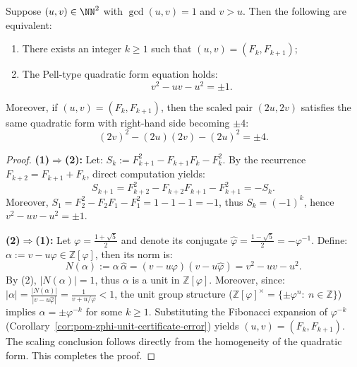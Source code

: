 \begin{proposition}\label{prop:pom-fib-pell-quadratic-characterization}
Suppose $(u,v)\in\NN^2$ with $\gcd(u,v)=1$ and $v>u$.
Then the following are equivalent:
\begin{enumerate}
  \item There exists an integer $k\ge 1$ such that $(u,v)=(F_k,F_{k+1})$;
  \item The Pell-type quadratic form equation holds:
  \[
  \boxed{\;v^2-uv-u^2=\pm 1.\;}
  \]
\end{enumerate}
Moreover, if $(u,v)=(F_k,F_{k+1})$, then the scaled pair $(2u,2v)$ satisfies the same quadratic form with right-hand side becoming $\pm 4$:
\[
(2v)^2-(2u)(2v)-(2u)^2=\pm 4.
\]
\end{proposition}
\begin{proof}
\textbf{(1)$\Rightarrow$(2):}
Let:
\(
S_k:=F_{k+1}^2-F_{k+1}F_k-F_k^2
\).
By the recurrence $F_{k+2}=F_{k+1}+F_k$, direct computation yields:
\[
S_{k+1}=F_{k+2}^2-F_{k+2}F_{k+1}-F_{k+1}^2=-S_k.
\]
Moreover, $S_1=F_2^2-F_2F_1-F_1^2=1-1-1=-1$, thus $S_k=(-1)^k$, hence $v^2-uv-u^2=\pm 1$.
\par
\textbf{(2)$\Rightarrow$(1):}
Let $\varphi=\frac{1+\sqrt5}{2}$ and denote its conjugate $\widehat\varphi=\frac{1-\sqrt5}{2}=-\varphi^{-1}$.
Define:
\(
\alpha:=v-u\varphi\in\mathbb{Z}[\varphi]
\),
then its norm is:
\[
N(\alpha):=\alpha\,\widehat\alpha=(v-u\varphi)(v-u\widehat\varphi)=v^2-uv-u^2.
\]
By (2), $|N(\alpha)|=1$, thus $\alpha$ is a unit in $\mathbb{Z}[\varphi]$.
Moreover, since:
\(
|\alpha|=\frac{|N(\alpha)|}{|v-u\widehat\varphi|}=\frac{1}{v+u/\varphi}<1
\),
the unit group structure ($\mathbb{Z}[\varphi]^\times=\{\pm\varphi^n:\ n\in\mathbb{Z}\}$) implies $\alpha=\pm\varphi^{-k}$ for some $k\ge 1$.
Substituting the Fibonacci expansion of $\varphi^{-k}$ (Corollary~\ref{cor:pom-zphi-unit-certificate-error}) yields $(u,v)=(F_k,F_{k+1})$.
The scaling conclusion follows directly from the homogeneity of the quadratic form. This completes the proof.
\end{proof}

